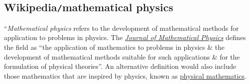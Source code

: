 \documentclass{article}
\begin{document}

\subsection{Wikipedia{\tt/}mathematical physics}
``{\it Mathematical physics} refers to the development of mathematical methods for application to problems in physics. The \href{https://en.wikipedia.org/wiki/Journal_of_Mathematical_Physics}{\it Journal of Mathematical Physics} defines the field as ``the application of mathematics to problems in physics \& the development of mathematical methods suitable for such applications \& for the formulation of physical theories''. An alternative definition would also include those mathematics that are inspired by physics, known as \href{https://en.wikipedia.org/wiki/Physical_mathematics}{physical mathematics}.
\end{document}
